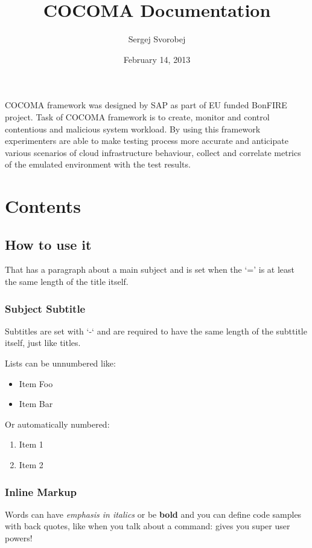 \documentclass[letterpaper,10pt,english]{sphinxmanual}
\title{COCOMA Documentation}
\date{February 14, 2013}
\author{Sergej Svorobej}
\begin{document}
\maketitle
\tableofcontents
{}\label{index::doc}


COCOMA framework was designed by SAP as part of EU funded BonFIRE project. Task of COCOMA framework is
to create, monitor and control contentious and malicious system workload. By using
this framework experimenters are able to make testing process more accurate
and anticipate various scenarios of cloud infrastructure behaviour, collect and
correlate metrics of the emulated environment with the test results.


\chapter{Contents}
\label{index:controlled-contentious-and-malicious-cocoma-framework-1-0}\label{index:contents}

\section{How to use it}
\label{01_how_to_use_it:how-to-use-it}\label{01_how_to_use_it::doc}
That has a paragraph about a main subject and is set when the `='
is at least the same length of the title itself.


\subsection{Subject Subtitle}
\label{01_how_to_use_it:subject-subtitle}
Subtitles are set with `-` and are required to have the same length
of the subttitle itself, just like titles.

Lists can be unnumbered like:
\begin{itemize}
\item {} 
Item Foo

\item {} 
Item Bar

\end{itemize}

Or automatically numbered:
\begin{enumerate}
\item {} 
Item 1

\item {} 
Item 2

\end{enumerate}


\subsection{Inline Markup}
\label{01_how_to_use_it:inline-markup}
Words can have \emph{emphasis in italics} or be \textbf{bold} and you can
define code samples with back quotes, like when you talk about a
command:  gives you super user powers!
\end{document}
